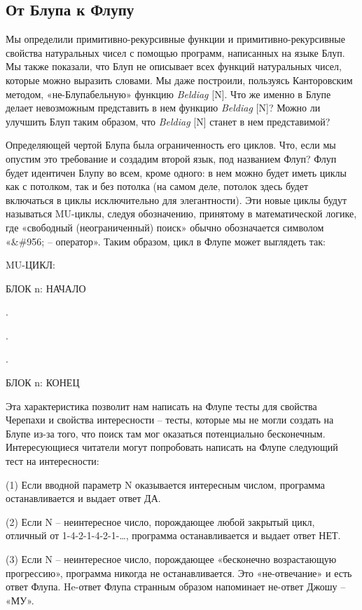 \documentclass[../main.tex]{subfiles}
\begin{document}
\subsection{От Блупа к Флупу}

Мы определили примитивно-рекурсивные функции и примитивно-рекурсивные свойства натуральных чисел с помощью программ, написанных на языке Блуп. Мы также показали, что Блуп не описывает всех функций натуральных чисел, которые можно выразить словами. Мы даже построили, пользуясь Канторовским методом, «не-Блупабельную» функцию \emph{Beldiag} {[}N{]}. Что же именно в Блупе делает невозможным представить в нем функцию \emph{Beldiag} {[}N{]}? Можно ли улучшить Блуп таким образом, что \emph{Beldiag} {[}N{]} станет в нем представимой?

Определяющей чертой Блупа была ограниченность его циклов. Что, если мы опустим это требование и создадим второй язык, под названием Флуп? Флуп будет идентичен Блупу во всем, кроме одного: в нем можно будет иметь циклы как с потолком, так и без потолка (на самом деле, потолок здесь будет включаться в циклы исключительно для элегантности). Эти новые циклы будут называться MU-циклы, следуя обозначению, принятому в математической логике, где «свободный (неограниченный) поиск» обычно обозначается символом «\&\#956; \--- оператор». Таким образом, цикл в Флупе может выглядеть так:

MU-ЦИКЛ:

БЛОК n: НАЧАЛО

.

.

.~

БЛОК n: КОНЕЦ

Эта характеристика позволит нам написать на Флупе тесты для свойства Черепахи и свойства интересности \--- тесты, которые мы не могли создать на Блупе из-за того, что поиск там мог оказаться потенциально бесконечным. Интересующиеся читатели могут попробовать написать на Флупе следующий тест на интересности:

(1) Если вводной параметр N оказывается интересным числом, программа останавливается и выдает ответ ДА.

(2) Если N \--- неинтересное число, порождающее любой закрытый цикл, отличный от 1-4-2-1-4-2-1-\ldots, программа останавливается и выдает ответ НЕТ.

(3) Если N \--- неинтересное число, порождающее «бесконечно возрастающую прогрессию», программа никогда не останавливается. Это «не-отвечание» и есть ответ Флупа. He-ответ Флупа странным образом напоминает не-ответ Джошу \--- «МУ».
\end{document}
